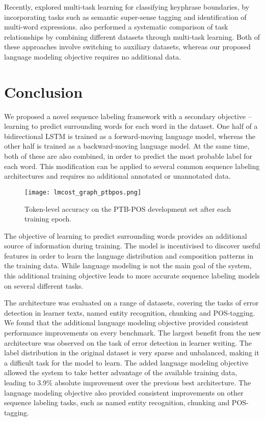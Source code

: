 \documentclass[11pt,a4paper]{article}
\begin{document}
Recently,  explored multi-task learning for classifying keyphrase boundaries, by incorporating tasks such as semantic super-sense tagging and identification of multi-word expressions.  also performed a systematic comparison of task relationships by combining different datasets through multi-task learning. Both of these approaches involve switching to auxiliary datasets, whereas our proposed language modeling objective requires no additional data.



\section{Conclusion}

We proposed a novel sequence labeling framework with a secondary objective -- learning to predict surrounding words for each word in the dataset.
One half of a bidirectional LSTM is trained as a forward-moving language model, whereas the other half is trained as a backward-moving language model. At the same time, both of these are also combined, in order to predict the most probable label for each word.
This modification can be applied to several common sequence labeling architectures and requires no additional annotated or unannotated data.


\begin{figure}[t]
	\texttt{[image: lmcost\_graph\_ptbpos.png]}
	\caption{Token-level accuracy on the PTB-POS development set after each training epoch.}
	\label{fig:graph_ptbpos}
\end{figure}


The objective of learning to predict surrounding words provides an additional source of information during training. The model is incentivised to discover useful features in order to learn the language distribution and composition patterns in the training data. While language modeling is not the main goal of the system, this additional training objective leads to more accurate sequence labeling models on several different tasks.

The architecture was evaluated on a range of datasets, covering the tasks of error detection in learner texts, named entity recognition, chunking and POS-tagging.
We found that the additional language modeling objective provided consistent performance improvements on every benchmark.
The largest benefit from the new architecture was observed on the task of error detection in learner writing. 
The label distribution in the original dataset is very sparse and unbalanced, making it a difficult task for the model to learn. 
The added language modeling objective allowed the system to take better advantage of the available training data, leading to 3.9\% absolute improvement over the previous best architecture.
The language modeling objective also provided consistent improvements on other sequence labeling tasks, such as named entity recognition, chunking and POS-tagging.
\end{document}
